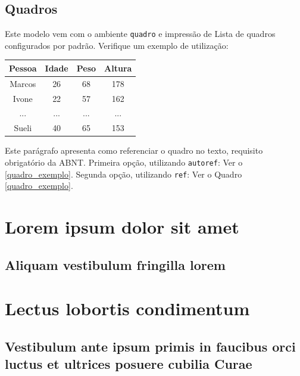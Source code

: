 \documentclass[
	12pt,				%
	openright,			%
	oneside,			%
	a4paper,			%
	english,			%
	brazil				%
	]{abntex2}
\begin{document}
\section{Quadros}

Este modelo vem com o ambiente \texttt{quadro} e impressão de Lista de quadros 
configurados por padrão. Verifique um exemplo de utilização:

\begin{quadro}[htb]
\caption{\label{quadro_exemplo}Exemplo de quadro}
\begin{tabular}{|c|c|c|c|}
	\hline
	\textbf{Pessoa} & \textbf{Idade} & \textbf{Peso} & \textbf{Altura} \\ \hline
	Marcos & 26    & 68   & 178    \\ \hline
	Ivone  & 22    & 57   & 162    \\ \hline
	...    & ...   & ...  & ...    \\ \hline
	Sueli  & 40    & 65   & 153    \\ \hline
\end{tabular}
\end{quadro}

Este parágrafo apresenta como referenciar o quadro no texto, requisito
obrigatório da ABNT. 
Primeira opção, utilizando \texttt{autoref}: Ver o \autoref{quadro_exemplo}. 
Segunda opção, utilizando  \texttt{ref}: Ver o Quadro \ref{quadro_exemplo}.


\chapter{Lorem ipsum dolor sit amet}

\section{Aliquam vestibulum fringilla lorem}

\lipsum[1]

\lipsum[2-3]

\chapter{Lectus lobortis condimentum}

\section{Vestibulum ante ipsum primis in faucibus orci luctus et ultrices
posuere cubilia Curae}
\end{document}
